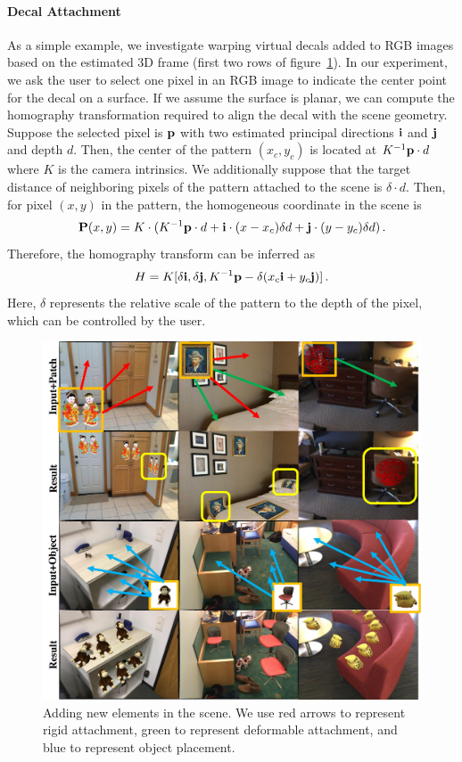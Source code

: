 \paragraph{Decal Attachment}  As a simple example, we investigate warping virtual decals added to RGB images based on the estimated 3D frame (first two rows of figure~\ref{fig:framenet-attach}). In our experiment, we ask the user to select one pixel in an RGB image to indicate the center point for the decal on a surface.  If we assume the surface is planar, we can compute the homography transformation required to align the decal with the scene geometry. Suppose the selected pixel is $\mathbf{p}$ with two estimated principal directions $\mathbf{i}$ and $\mathbf{j}$ and depth $d$. Then, the center of the pattern $(x_c,y_c)$ is located at $K^{-1}\mathbf{p}\cdot d$ where $K$ is the camera intrinsics. We additionally suppose that the target distance of neighboring pixels of the pattern attached to the scene is $\delta\cdot d$. Then, for pixel $(x,y)$ in the pattern, the homogeneous coordinate in the scene is
\begin{equation}
\textbf{P}(x,y) = K\cdot(K^{-1}\mathbf{p}\cdot d + \textbf{i}\cdot (x-x_c)\delta d + \textbf{j}\cdot (y-y_c)\delta d)\,.
\end{equation}
Therefore, the homography transform can be inferred as
\begin{equation}
    H=K[\delta \mathbf{i}, \delta \mathbf{j}, K^{-1}\mathbf{p} - \delta(x_c\mathbf{i}+y_c\mathbf{j})]\,.
\end{equation}
Here, $\delta$ represents the relative scale of the pattern to the depth of the pixel, which can be controlled by the user.
\begin{figure}
    \centering
    \includegraphics[width=\linewidth]{FrameNet/graph/attach.pdf}
    \caption{Adding new elements in the scene. We  use red arrows to represent rigid attachment, green to represent deformable attachment, and blue to represent object placement.}
    \label{fig:framenet-attach}
    \vspace{-0.15in}
\end{figure}
